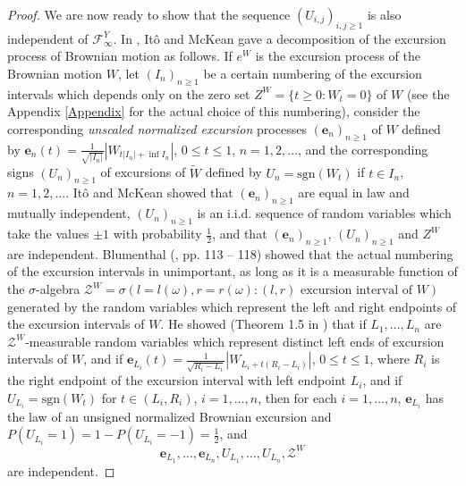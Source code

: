 \documentclass[reqno]{amsart}
\theoremstyle{definition}
\theoremstyle{remark}
\numberwithin{equation}{section}
\begin{document}
\begin{proof}
\label{pagina de referinta start descompuere Ito-McKean}
We are now ready to show that the sequence $(U_{i,j})_{i,j\ge 1}$ is also independent of $\mathcal{F}^Y_\infty$. In \cite{Ito}, It\^{o} and McKean gave a decomposition of the excursion process of Brownian motion as follows. If $e^W$ is the excursion process of the Brownian motion $W$, let $(I_n)_{n\ge 1}$ be a certain numbering of the excursion intervals which depends only on the zero set $Z^W=\{t\ge0:W_t=0\}$ of $W$ (see the Appendix \ref{Appendix} for the actual choice of this numbering), consider the corresponding \emph{unscaled normalized excursion} processes $(\mathbf{e}_n)_{n\ge 1}$ of $W$ defined by $\mathbf{e}_n(t)=\frac{1}{\sqrt{\vert I_n\vert}} \left\vert W_{t\vert I_n\vert +\inf I_n}\right\vert$, $0\le t\le 1$, $n=1,2,\ldots$, and the corresponding signs $(U_n)_{n\ge 1}$ of excursions of $\widetilde{W}$ defined by $U_n=\mathrm{sgn}(W_t)$ if $t\in I_n$, $n=1,2,\ldots$. It\^{o} and McKean showed that $(\mathbf{e}_n)_{n\ge 1}$ are equal in law and mutually independent, $(U_n)_{n\ge 1}$ is an i.i.d. sequence of random variables which take the values $\pm1$ with probability $\frac12$, and that $(\mathbf{e}_n)_{n\ge 1}$, $(U_n)_{n\ge 1}$ and $Z^W$ are independent. Blumenthal (\cite{Blumenthal}, pp. 113 -- 118) showed that the actual numbering of the excursion intervals in unimportant, as long as it is a measurable function of the $\sigma$-algebra $\mathcal{Z}^W=\sigma(l=l(\omega),r=r(\omega):(l,r) \text{ excursion interval of } W)$ generated by the random variables which represent the left and right endpoints of the excursion intervals of $W$. He showed (Theorem 1.5 in \cite{Blumenthal}) that if $L_1,\ldots,L_n$ are $\mathcal{Z}^W$-measurable random variables which represent distinct left ends of excursion intervals of $W$, and if $\mathbf{e}_{L_i}(t)=\frac{1}{\sqrt{R_i-L_i}}\left\vert W_{L_i+t(R_i-L_i)}\right\vert$, $0\le t\le 1$, where $R_i$ is the right endpoint of the excursion interval with left endpoint $L_i$, and if  $U_{L_i}=\mathrm{sgn}(W_t)$ for $t\in(L_i,R_i)$, $i=1,\ldots,n$, then for each $i=1,\ldots,n$, $\textbf{e}_{L_i}$ has the law of an unsigned normalized Brownian excursion and $P(U_{L_i}=1)=1-P(U_{L_i}=-1)=\frac12$, and
\[
\textbf{e}_{L_1},\ldots,\textbf{e}_{L_n}, U_{L_1},\ldots,U_{L_n},\mathcal{Z}^W
\]
are independent.


\end{proof}
\end{document}

